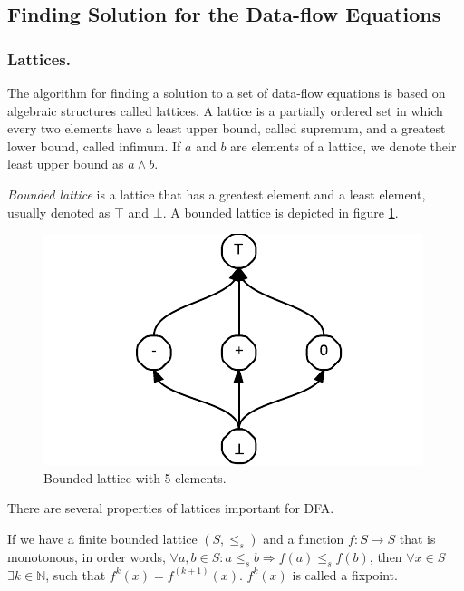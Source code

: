         \subsection{Finding Solution for the Data-flow Equations}
        
        \subsubsection*{Lattices.}
        The algorithm for finding a solution to a set of data-flow 
        equations is based on algebraic structures called lattices. 
        A lattice is a partially ordered set in which every 
        two elements have a least upper bound, called supremum, 
        and a greatest lower bound, called infimum. If $a$ and 
        $b$ are elements of a lattice, we denote their least upper 
        bound as $a\wedge{}b$.
        
        \emph{Bounded lattice} is a lattice that has 
        a greatest element and a least element, 
        usually denoted as $\top$ and $\bot$. 
        A bounded lattice is depicted in figure \ref{lattice}.       
        
\begin{figure}[h]  
  \centering
    \includegraphics{img/lattice.pdf}
  \caption{Bounded lattice with 5 elements.\label{lattice}}    
\end{figure}

        There are several properties of lattices important for DFA.
        
        If we have a finite bounded lattice $(S, \leq_{s})$ and a function 
        $f:S\rightarrow{S}$ that is monotonous, in order words, 
        $\forall{a,b\in{S}}: a\leq_s{b} \Rightarrow f(a)\leq_s{f(b)}$, 
        then $\forall{x\in{S}}$ $\exists{k\in\mathbb{N}}$, such that 
        $f^k(x)=f^{(k+1)}(x)$. $f^k(x)$ is called a fixpoint.
        
